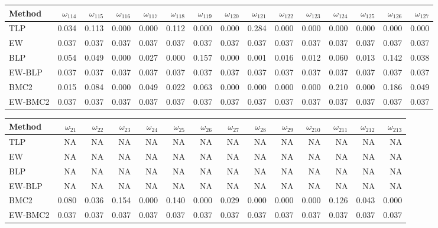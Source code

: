 \documentclass[
]{article}
\begin{document}
\begin{tabular}{lrrrrrrrrrrrrrr}
\toprule
Method & $\omega_{114}$ & $\omega_{115}$ & $\omega_{116}$ & $\omega_{117}$ & $\omega_{118}$ & $\omega_{119}$ & $\omega_{120}$ & $\omega_{121}$ & $\omega_{122}$ & $\omega_{123}$ & $\omega_{124}$ & $\omega_{125}$ & $\omega_{126}$ & $\omega_{127}$\\
\midrule
TLP & 0.034 & 0.113 & 0.000 & 0.000 & 0.112 & 0.000 & 0.000 & 0.284 & 0.000 & 0.000 & 0.000 & 0.000 & 0.000 & 0.000\\
EW & 0.037 & 0.037 & 0.037 & 0.037 & 0.037 & 0.037 & 0.037 & 0.037 & 0.037 & 0.037 & 0.037 & 0.037 & 0.037 & 0.037\\
BLP & 0.054 & 0.049 & 0.000 & 0.027 & 0.000 & 0.157 & 0.000 & 0.001 & 0.016 & 0.012 & 0.060 & 0.013 & 0.142 & 0.038\\
EW-BLP & 0.037 & 0.037 & 0.037 & 0.037 & 0.037 & 0.037 & 0.037 & 0.037 & 0.037 & 0.037 & 0.037 & 0.037 & 0.037 & 0.037\\
BMC2 & 0.015 & 0.084 & 0.000 & 0.049 & 0.022 & 0.063 & 0.000 & 0.000 & 0.000 & 0.000 & 0.210 & 0.000 & 0.186 & 0.049\\
EW-BMC2 & 0.037 & 0.037 & 0.037 & 0.037 & 0.037 & 0.037 & 0.037 & 0.037 & 0.037 & 0.037 & 0.037 & 0.037 & 0.037 & 0.037\\
\bottomrule
\end{tabular}

\begin{tabular}{lrrrrrrrrrrrrr}
\toprule
Method & $\omega_{21}$ & $\omega_{22}$ & $\omega_{23}$ & $\omega_{24}$ & $\omega_{25}$ & $\omega_{26}$ & $\omega_{27}$ & $\omega_{28}$ & $\omega_{29}$ & $\omega_{210}$ & $\omega_{211}$ & $\omega_{212}$ & $\omega_{213}$\\
\midrule
TLP & NA & NA & NA & NA & NA & NA & NA & NA & NA & NA & NA & NA & NA\\
EW & NA & NA & NA & NA & NA & NA & NA & NA & NA & NA & NA & NA & NA\\
BLP & NA & NA & NA & NA & NA & NA & NA & NA & NA & NA & NA & NA & NA\\
EW-BLP & NA & NA & NA & NA & NA & NA & NA & NA & NA & NA & NA & NA & NA\\
BMC2 & 0.080 & 0.036 & 0.154 & 0.000 & 0.140 & 0.000 & 0.029 & 0.000 & 0.000 & 0.000 & 0.126 & 0.043 & 0.000\\
EW-BMC2 & 0.037 & 0.037 & 0.037 & 0.037 & 0.037 & 0.037 & 0.037 & 0.037 & 0.037 & 0.037 & 0.037 & 0.037 & 0.037\\
\bottomrule
\end{tabular}
\end{document}
